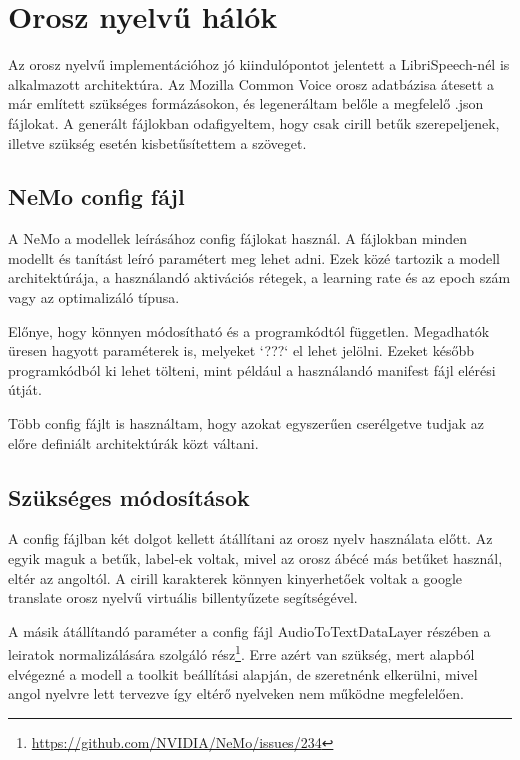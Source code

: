 \section{Orosz nyelvű hálók}

Az orosz nyelvű implementációhoz jó kiindulópontot jelentett a LibriSpeech-nél is alkalmazott architektúra. Az Mozilla Common Voice orosz adatbázisa átesett a már említett szükséges formázásokon, és legeneráltam belőle a megfelelő .json fájlokat. A generált fájlokban odafigyeltem, hogy csak cirill betűk szerepeljenek, illetve szükség esetén kisbetűsítettem a szöveget.

\subsection{NeMo config fájl}

A NeMo a modellek leírásához config fájlokat használ. A fájlokban minden modellt és tanítást leíró paramétert meg lehet adni. Ezek közé tartozik a modell architektúrája, a használandó aktivációs rétegek, a learning rate és az epoch szám vagy az optimalizáló típusa.

Előnye, hogy könnyen módosítható és a programkódtól független. Megadhatók üresen hagyott paraméterek is, melyeket `???` el lehet jelölni. Ezeket később programkódból ki lehet tölteni, mint például a használandó manifest fájl elérési útját.

Több config fájlt is használtam, hogy azokat egyszerűen cserélgetve tudjak az előre definiált architektúrák közt váltani.

\subsection{Szükséges módosítások}

A config fájlban két dolgot kellett átállítani az orosz nyelv használata előtt. Az egyik maguk a betűk, label-ek voltak, mivel az orosz ábécé más betűket használ, eltér az angoltól. A cirill karakterek könnyen kinyerhetőek voltak a google translate orosz nyelvű virtuális billentyűzete segítségével.

A másik átállítandó paraméter a config fájl AudioToTextDataLayer részében a leiratok normalizálására szolgáló rész\footnote{\url{https://github.com/NVIDIA/NeMo/issues/234}}. Erre azért van szükség, mert alapból elvégezné a modell a toolkit beállítási alapján, de szeretnénk elkerülni, mivel angol nyelvre lett tervezve így eltérő nyelveken nem működne megfelelően.

